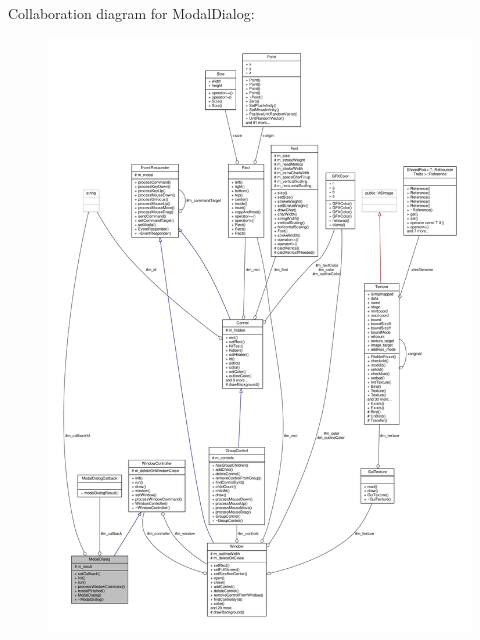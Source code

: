 Collaboration diagram for Modal\+Dialog\+:
\nopagebreak
\begin{figure}[H]
\begin{center}
\leavevmode
\includegraphics[width=350pt]{dc/dfd/classModalDialog__coll__graph}
\end{center}
\end{figure}
